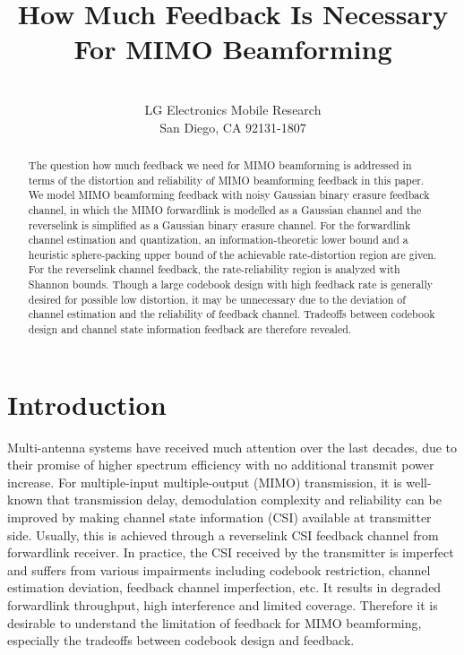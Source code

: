 \documentclass[10pt,fleqn, twocolumn]{IEEEtran}
\title{How Much Feedback Is Necessary For MIMO Beamforming}
\author{\\LG Electronics Mobile Research\\San Diego, CA 92131-1807}
\date{}
\begin{document}
\maketitle
\begin{abstract}\small
The question how much feedback we need for MIMO beamforming is
addressed in terms of the distortion and reliability of MIMO
beamforming feedback in this paper. We model MIMO beamforming
feedback with noisy Gaussian binary erasure feedback channel, in
which the MIMO forwardlink is modelled as a Gaussian channel and
the reverselink is simplified as a Gaussian binary erasure
channel. For the forwardlink channel estimation and quantization,
an information-theoretic lower bound and a heuristic
sphere-packing upper bound of the achievable rate-distortion
region are given. For the reverselink channel feedback, the
rate-reliability region is analyzed with Shannon bounds. Though a
large codebook design with high feedback rate is generally desired
for possible low distortion, it may be unnecessary due to the
deviation of channel estimation and the reliability of feedback
channel. Tradeoffs between codebook design and channel state
information feedback are therefore revealed.
\end{abstract}

\section{Introduction}
Multi-antenna systems have received much attention over the last
decades, due to their promise of higher spectrum efficiency with
no additional transmit power increase. For multiple-input
multiple-output (MIMO) transmission, it is well-known that
transmission delay, demodulation complexity and reliability can be
improved by making channel state information (CSI) available at
transmitter side. Usually, this is achieved through a reverselink
CSI feedback channel from forwardlink receiver. In practice, the
CSI received by the transmitter is imperfect and suffers from
various impairments including codebook restriction, channel
estimation deviation, feedback channel imperfection, etc. It
results in degraded forwardlink throughput, high interference and
limited coverage. Therefore it is desirable to understand the
limitation of feedback for MIMO beamforming, especially the
tradeoffs between codebook design and feedback.
\end{document}
